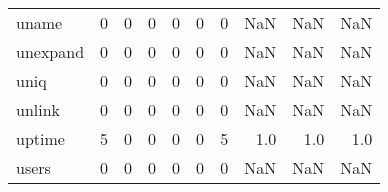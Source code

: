 \begin{tabular}{lrrrrrrrrr}
uname     &                                                  0 &                                                  0 &                                                  0 &                                                  0 &                                                  0 &                                                  0 &                                                NaN &                                    NaN &                                  NaN \\
unexpand  &                                                  0 &                                                  0 &                                                  0 &                                                  0 &                                                  0 &                                                  0 &                                                NaN &                                    NaN &                                  NaN \\
uniq      &                                                  0 &                                                  0 &                                                  0 &                                                  0 &                                                  0 &                                                  0 &                                                NaN &                                    NaN &                                  NaN \\
unlink    &                                                  0 &                                                  0 &                                                  0 &                                                  0 &                                                  0 &                                                  0 &                                                NaN &                                    NaN &                                  NaN \\
uptime    &                                                  5 &                                                  0 &                                                  0 &                                                  0 &                                                  0 &                                                  5 &                                                1.0 &                                    1.0 &                                  1.0 \\
users     &                                                  0 &                                                  0 &                                                  0 &                                                  0 &                                                  0 &                                                  0 &                                                NaN &                                    NaN &                                  NaN \\

\end{tabular}
